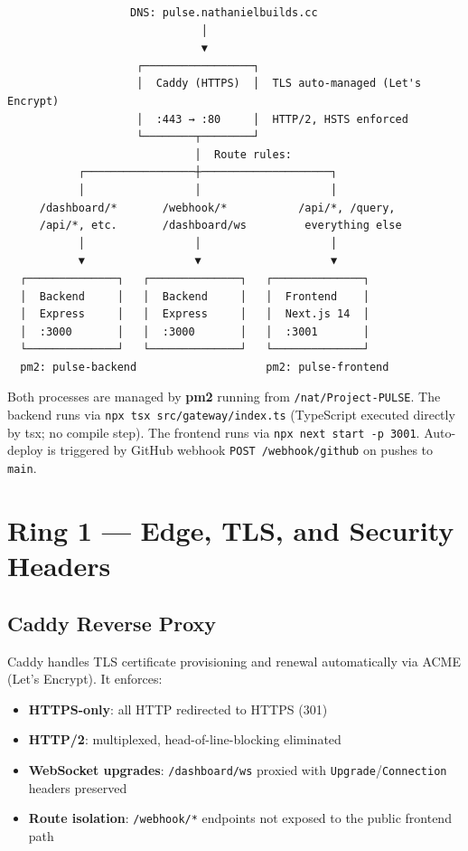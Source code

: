 \documentclass[12pt,a4paper]{article}
\begin{document}
\begin{lstlisting}
                   DNS: pulse.nathanielbuilds.cc
                              │
                              ▼
                    ┌─────────────────┐
                    │  Caddy (HTTPS)  │  TLS auto-managed (Let's Encrypt)
                    │  :443 → :80     │  HTTP/2, HSTS enforced
                    └────────┬────────┘
                             │  Route rules:
           ┌─────────────────┼────────────────────┐
           │                 │                    │
     /dashboard/*       /webhook/*           /api/*, /query,
     /api/*, etc.       /dashboard/ws         everything else
           │                 │                    │
           ▼                 ▼                    ▼
  ┌──────────────┐   ┌──────────────┐   ┌──────────────┐
  │  Backend     │   │  Backend     │   │  Frontend    │
  │  Express     │   │  Express     │   │  Next.js 14  │
  │  :3000       │   │  :3000       │   │  :3001       │
  └──────────────┘   └──────────────┘   └──────────────┘
  pm2: pulse-backend                    pm2: pulse-frontend
\end{lstlisting}

Both processes are managed by \textbf{pm2} running from \texttt{/nat/Project-PULSE}.
The backend runs via \texttt{npx tsx src/gateway/index.ts} (TypeScript executed
directly by tsx; no compile step). The frontend runs via \texttt{npx next start -p 3001}.
Auto-deploy is triggered by GitHub webhook \texttt{POST /webhook/github} on pushes
to \texttt{main}.

\section{Ring 1 — Edge, TLS, and Security Headers}
\label{sec:ring1}

\subsection{Caddy Reverse Proxy}

Caddy handles TLS certificate provisioning and renewal automatically via ACME (Let's Encrypt).
It enforces:
\begin{itemize}[noitemsep]
  \item \textbf{HTTPS-only}: all HTTP redirected to HTTPS (301)
  \item \textbf{HTTP/2}: multiplexed, head-of-line-blocking eliminated
  \item \textbf{WebSocket upgrades}: \texttt{/dashboard/ws} proxied with \texttt{Upgrade}/\texttt{Connection}
    headers preserved
  \item \textbf{Route isolation}: \texttt{/webhook/*} endpoints not exposed to the public frontend path
\end{itemize}
\end{document}
